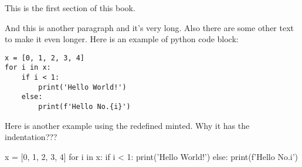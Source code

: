 \documentclass[a4paper,9pt]{article}
\begin{document}
This is the first section of this book.

And this is another paragraph and it's very long.
Also there are some other text to make it even longer.
Here is an example of python code block:
\begin{verbatim}
x = [0, 1, 2, 3, 4]
for i in x:
    if i < 1:
        print('Hello World!')
    else:
        print(f'Hello No.{i}')
\end{verbatim}

Here is another example using the redefined minted. Why it has the indentation???
\begin{pycode}
  x = [0, 1, 2, 3, 4]
  for i in x:
      if i < 1:
          print('Hello World!')
      else:
          print(f'Hello No.{i}')
  \end{pycode}
\end{document}

